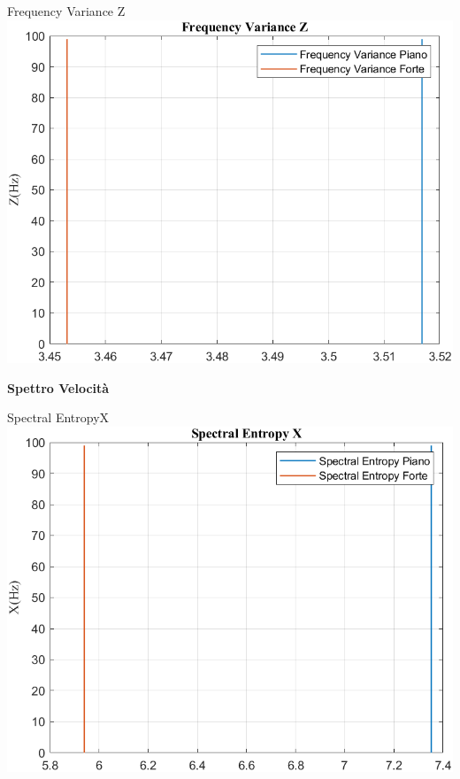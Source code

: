 	\begin{frame}{{Frequency Variance Z}}
		\centering\includegraphics[height=.8\textheight]{figure/Vel/Trasformata/Frequency VarianceZ}
	\end{frame}
	
	\begin{frame}
		\color{blue}\centering\huge{\textbf{Spettro Velocità}}
	\end{frame}
	
	\begin{frame}{{Spectral EntropyX}}
		\centering\includegraphics[height=.8\textheight]{figure/Vel/Trasformata/Spectral EntropyX}
	\end{frame}
	
